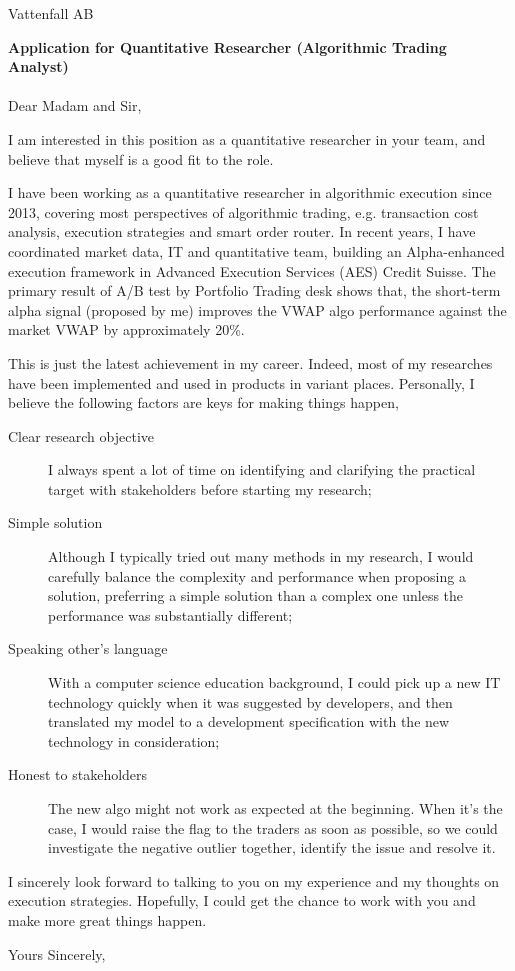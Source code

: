 \documentclass[a4paper, 11pt]{letter}
\begin{document}
 
\begin{letter}{%
    Vattenfall AB} 
\opening{\textbf{\large{Application for Quantitative Researcher (Algorithmic Trading Analyst)}}\\
\vspace{-5pt}\\ Dear Madam and Sir,}
I am interested in this position as a quantitative researcher in your team, and believe that myself is a good fit to the role.

I have been working as a quantitative researcher in algorithmic execution since 2013, covering most perspectives of algorithmic trading, e.g. transaction cost analysis, execution strategies and smart order router. In recent years, I have coordinated market data, IT and quantitative team, building an Alpha-enhanced execution framework in Advanced Execution Services (AES) Credit Suisse. The primary result of A/B test by Portfolio Trading desk shows that, the short-term alpha signal (proposed by me) improves the VWAP algo performance against the market VWAP by approximately 20\%.

This is just the latest achievement in my career. Indeed, most of my researches have been implemented and used in products in variant places. Personally, I believe the following factors are keys for making things happen,  
\begin{description}
    \item[Clear research objective] I always spent a lot of time on identifying and clarifying the practical target with stakeholders before starting my research;
    \item[Simple solution] Although I typically tried out many methods in my research, I would carefully balance the complexity and performance when proposing a solution, preferring a simple solution than a complex one unless the performance was substantially different;
    \item[Speaking other's language] With a computer science education background, I could pick up a new IT technology quickly when it was suggested by developers, and then translated my model to a development specification with the new technology in consideration;
    \item[Honest to stakeholders] The new algo might not work as expected at the beginning. When it's the case, I would raise the flag to the traders as soon as possible, so we could investigate the negative outlier together, identify the issue and resolve it. 
\end{description}

I sincerely look forward to talking to you on my experience and my thoughts on execution strategies. Hopefully, I could get the chance to work with you and make more great things happen.  

 
\closing{Yours Sincerely,}
 
 
\end{letter}
 
\end{document}
